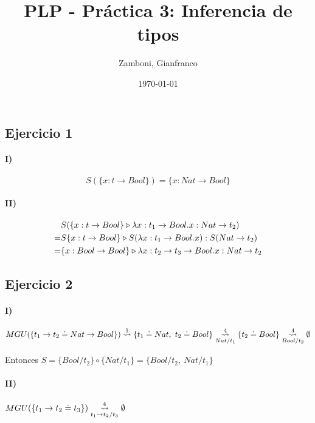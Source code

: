 \documentclass[10pt,a4paper]{article}
\begin{document}
\title{PLP - Práctica 3: Inferencia de tipos}

\date{\today}

\author{Zamboni, Gianfranco}

\maketitle
\setcounter{page}{1}

\subsection{Ejercicio 1}
\paragraph{I)} $$S(\{x:t\to Bool\}) = \{x: Nat\to Bool\}$$
\paragraph{II)} 
\begin{equation*}
\begin{split}
&S(\judgeType{\{x:t\to Bool\}}{\lambdaAbs{x}{t_1\to Bool}{x}}{Nat\to t_2}) \\
= &\judgeType{S\{x:t\to Bool\}}{S(\lambdaAbs{x}{t_1\to Bool}{x})}{S(Nat\to t_2)} \\
= &\judgeType{\{x:Bool\to Bool\}}{\lambdaAbs{x}{t_2\to t_3\to Bool}{x}}{Nat\to t_2}
\end{split}
\end{equation*}

\subsection{Ejercicio 2}
\paragraph{I)}
\begin{align*}
MGU(\{t_1\to t_2\doteq Nat\to Bool\}) \goesTo{1}{} \{t_1\doteq Nat,~t_2\doteq Bool\} \goesTo{4}{Nat/t_1} \{t_2\doteq Bool\} \goesTo{4}{Bool/t_2} \emptyset
\end{align*}

Entonces $S=\{Bool/t_2\}\circ\{Nat/t_1\} = \{Bool/t_2,~Nat/t_1\}$

\paragraph{II)}$MGU(\{t_1\to t_2\doteq t_3\}) \goesTo{4}{t_1\to t_2/t_3} \emptyset$
\end{document}
